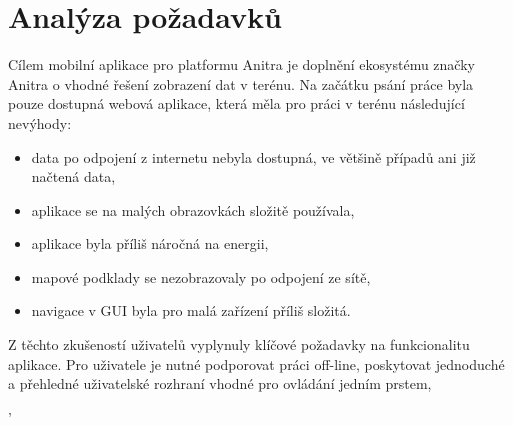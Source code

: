 
\chapter{Analýza požadavků}

Cílem mobilní aplikace pro platformu Anitra je doplnění ekosystému značky Anitra o vhodné řešení zobrazení dat v terénu. Na začátku psání práce byla pouze dostupná webová aplikace, která měla pro práci v terénu následující nevýhody:

\begin{itemize}
	\item data po odpojení z internetu nebyla dostupná, ve většině případů ani již načtená data,
	\item aplikace se na malých obrazovkách složitě používala,
	\item aplikace byla příliš náročná na energii,
	\item mapové podklady se nezobrazovaly po odpojení ze sítě,
	\item navigace v GUI byla pro malá zařízení příliš složitá.
\end{itemize}

Z těchto zkušeností uživatelů vyplynuly klíčové požadavky na funkcionalitu aplikace. Pro uživatele je nutné podporovat práci off-line, poskytovat jednoduché a přehledné uživatelské rozhraní vhodné pro ovládání jedním prstem, 


'%